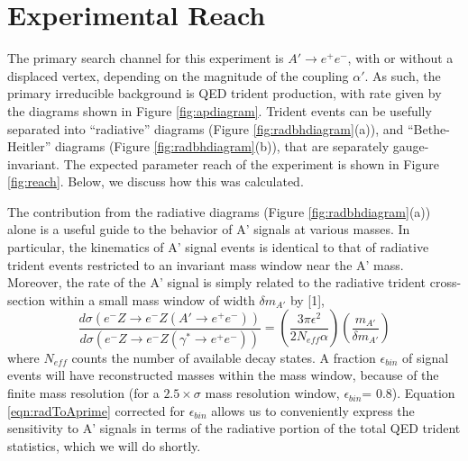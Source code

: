 \section{Experimental Reach}

The primary search channel for this experiment is $A' \rightarrow e^+ e^-$, with or without
 a displaced vertex, depending on the magnitude of the coupling $\alpha'$. As such, 
the primary irreducible 
background is QED trident production, with rate given by the diagrams shown in 
Figure \ref{fig:apdiagram}. Trident events can be usefully separated into ``radiative'' diagrams 
(Figure \ref{fig:radbhdiagram}(a)), and ``Bethe-Heitler'' diagrams (Figure \ref{fig:radbhdiagram}(b)), that are separately 
gauge-invariant.  The expected parameter reach of the experiment is shown in Figure \ref{fig:reach}.  Below, we discuss how this was calculated.  

The contribution from the radiative diagrams (Figure \ref{fig:radbhdiagram}(a)) alone is a useful guide 
to the behavior of A' signals at various masses.  In particular, the kinematics of A' 
signal events is identical to that of radiative trident events restricted to an invariant 
mass window near the A' mass.  Moreover, the rate of the A' signal is simply related to 
the radiative trident cross-section within a small mass window of width $\delta m_{A'}$  
by [1],
\begin{equation}
 {\frac{d\sigma(e^-Z\rightarrow e^-Z(A'\rightarrow e^+e^-))}
    {d\sigma(e^-Z\rightarrow e^-Z(\gamma^*\rightarrow e^+e^-))}} =
    \left({\frac{3\pi \epsilon^2}{2N_{eff}\alpha}}\right) \left({\frac{m_{A'}}{\delta m_{A'}}}\right)
  \label{eqn:radToAprime}
\end{equation}
where $N_{eff}$ counts the number of available decay states.  A fraction $\epsilon_{bin}$ 
of signal events will have reconstructed masses within the mass window, because of the 
finite mass resolution  (for a $2.5 \times \sigma$ mass resolution window, 
$\epsilon_{bin}$= 0.8).  Equation \ref{eqn:radToAprime} corrected for $\epsilon_{bin}$ allows us to 
conveniently express the sensitivity to A' signals in terms of the radiative portion 
of the total QED trident statistics, which we will do shortly. 

